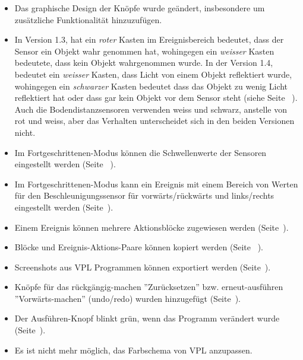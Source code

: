 \begin{itemize}

\item Das graphische Design der Knöpfe wurde geändert, insbesondere um zusätzliche Funktionalität hinzuzufügen.

\item In Version 1.3, hat ein \emph{roter} Kasten im Ereignisbereich bedeutet, dass der Sensor ein Objekt wahr genommen hat, wohingegen ein 
\emph{weisser} Kasten bedeutete, dass kein Objekt wahrgenommen wurde. In der Version 1.4, bedeutet ein \emph{weisser} Kasten, dass Licht von einem Objekt reflektiert wurde, wohingegen ein \emph{schwarzer} Kasten bedeutet dass das Objekt zu wenig Licht reflektiert hat oder dass gar kein Objekt vor dem Sensor steht (siehe Seite ~\pageref{p.proximity-colors1}).
Auch die Bodendistanzsensoren verwenden weiss und schwarz, anstelle von rot und weiss, aber das Verhalten unterscheidet sich in den beiden Versionen nicht. 
\item Im Fortgeschrittenen-Modus können die Schwellenwerte der Sensoren eingestellt werden (Seite ~\pageref{p.proximity-sensitivity}).
\item Im Fortgeschrittenen-Modus kann ein Ereignis mit einem Bereich von Werten für den Beschleunigungssensor für vorwärts/rückwärts und links/rechts eingestellt werden (Seite~\pageref{p.accel}).

\item Einem Ereignis können mehrere Aktionsblöcke zugewiesen werden (Seite~\pageref{p.multiple}).

\item Blöcke und Ereignis-Aktions-Paare können kopiert werden
(Seite ~\pageref{p.copy-pairs}).

\item Screenshots aus VPL Programmen können exportiert werden (Seite~\pageref{p.export}).

\item Knöpfe für das rückgängig-machen ''Zurücksetzen'' bzw. erneut-ausführen ''Vorwärts-machen'' (undo/redo) wurden hinzugefügt (Seite~\pageref{p.undo}).

\item Der Ausführen-Knopf blinkt grün, wenn das Programm verändert wurde
(Seite~\pageref{p.blink}).

\item Es ist nicht mehr möglich, das Farbschema von VPL anzupassen.

\end{itemize}
